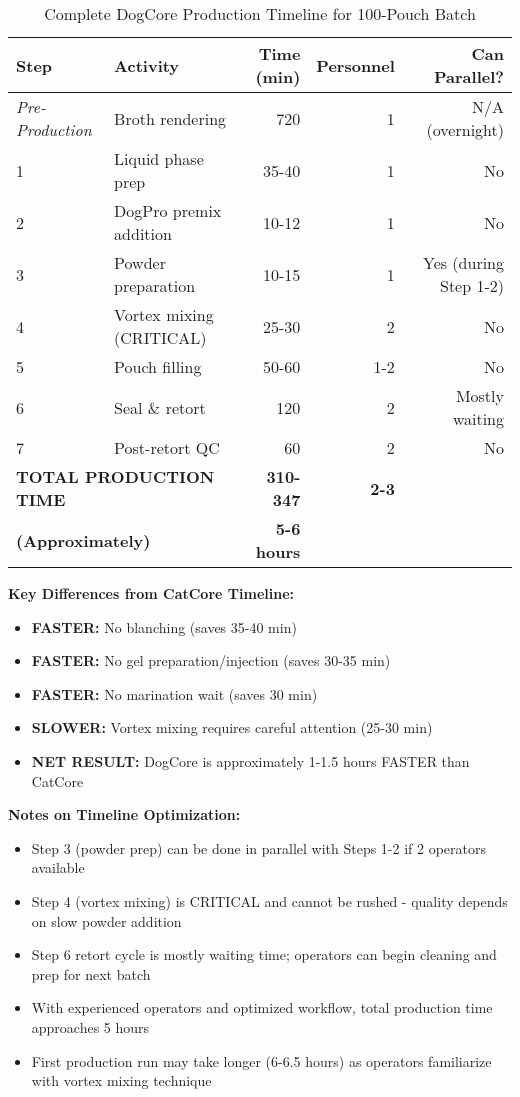 \begin{table}[h]
\centering
\caption{Complete DogCore Production Timeline for 100-Pouch Batch}
\label{tab:timeline_dogcore}
\begin{tabular}{@{}llrrr@{}}
\toprule
\textbf{Step} & \textbf{Activity} & \textbf{Time (min)} & \textbf{Personnel} & \textbf{Can Parallel?} \\
\midrule
\textit{Pre-Production} & Broth rendering & 720 & 1 & N/A (overnight) \\
\midrule
1 & Liquid phase prep & 35-40 & 1 & No \\
2 & DogPro premix addition & 10-12 & 1 & No \\
3 & Powder preparation & 10-15 & 1 & Yes (during Step 1-2) \\
4 & Vortex mixing (CRITICAL) & 25-30 & 2 & No \\
5 & Pouch filling & 50-60 & 1-2 & No \\
6 & Seal \& retort & 120 & 2 & Mostly waiting \\
7 & Post-retort QC & 60 & 2 & No \\
\midrule
\multicolumn{2}{l}{\textbf{TOTAL PRODUCTION TIME}} & \textbf{310-347} & \textbf{2-3} & \\
\multicolumn{2}{l}{\textbf{(Approximately)}} & \textbf{5-6 hours} & & \\
\bottomrule
\end{tabular}
\end{table}

\vspace{1em}
\noindent\textbf{Key Differences from CatCore Timeline:}
\begin{itemize}
\item \textbf{FASTER:} No blanching (saves 35-40 min)
\item \textbf{FASTER:} No gel preparation/injection (saves 30-35 min)
\item \textbf{FASTER:} No marination wait (saves 30 min)
\item \textbf{SLOWER:} Vortex mixing requires careful attention (25-30 min)
\item \textbf{NET RESULT:} DogCore is approximately 1-1.5 hours FASTER than CatCore
\end{itemize}

\vspace{1em}
\noindent\textbf{Notes on Timeline Optimization:}
\begin{itemize}
\item Step 3 (powder prep) can be done in parallel with Steps 1-2 if 2 operators available
\item Step 4 (vortex mixing) is CRITICAL and cannot be rushed - quality depends on slow powder addition
\item Step 6 retort cycle is mostly waiting time; operators can begin cleaning and prep for next batch
\item With experienced operators and optimized workflow, total production time approaches 5 hours
\item First production run may take longer (6-6.5 hours) as operators familiarize with vortex mixing technique
\end{itemize}

